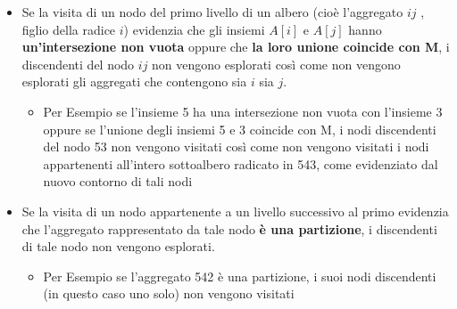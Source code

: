 \begin{itemize}
    \item Se la visita di un nodo del primo livello di un albero (cioè l’aggregato $ij$ , figlio della radice $i$) evidenzia che gli insiemi $A[i]$ e $A[j]$ hanno \textbf{un'intersezione non vuota} oppure che \textbf{la loro unione coincide con M}, i discendenti del nodo $ij$ non vengono esplorati così come non vengono esplorati gli aggregati che contengono sia $i$ sia $j$.
    \begin{itemize}
        \item Per Esempio se l’insieme 5 ha una intersezione non vuota con l’insieme 3 oppure se l’unione degli insiemi 5 e 3 coincide con M, i nodi discendenti del nodo 53 non vengono visitati così come non vengono visitati i nodi appartenenti all’intero sottoalbero radicato in 543, come evidenziato dal nuovo contorno di tali nodi
    \end{itemize}
    \item Se la visita di un nodo appartenente a un livello successivo al primo evidenzia che l’aggregato rappresentato da tale nodo \textbf{è una partizione}, i discendenti di tale nodo non vengono esplorati.
    \begin{itemize}
        \item Per Esempio se l’aggregato 542 è una partizione, i suoi nodi discendenti (in questo caso uno solo) non vengono visitati
    \end{itemize}
\end{itemize}

\newpage
